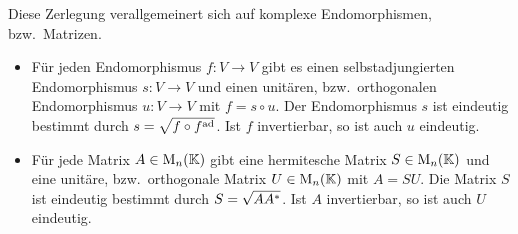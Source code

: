 Diese Zerlegung verallgemeinert sich auf komplexe Endomorphismen, bzw.\ Matrizen.

\begin{theorem}[Polarzerlegung]
  \leavevmode
  \begin{itemize}
    \item
      Für jeden Endomorphismus $f \colon V \to V$ gibt es einen selbstadjungierten Endomorphismus $s \colon V \to V$ und einen unitären, bzw.\ orthogonalen Endomorphismus $u \colon V \to V$ mit $f = s \circ u$.
      Der Endomorphismus $s$ ist eindeutig bestimmt durch $s = \sqrt{f \circ f^{\operatorname{ad}}}$.
      Ist $f$ invertierbar, so ist auch $u$ eindeutig.
    
    \item
      Für jede Matrix $A \in \operatorname{M}_{n}(\mathbb{K})$ gibt eine hermitesche Matrix $S \in \operatorname{M}_{n}(\mathbb{K})$ und eine unitäre, bzw.\ orthogonale Matrix $U \in \operatorname{M}_{n}(\mathbb{K})$ mit $A = SU$.
      Die Matrix $S$ ist eindeutig bestimmt durch $S = \sqrt{A A^*}$.
      Ist $A$ invertierbar, so ist auch $U$ eindeutig.
  \end{itemize}
\end{theorem}




